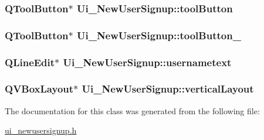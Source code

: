 \hypertarget{classUi__NewUserSignup_a8986890bfaa033e0f7cd167fe2bbd078}{
\subsubsection[{tool\-Button}]{\setlength{\rightskip}{0pt plus 5cm}Q\-Tool\-Button$\ast$ Ui\-\_\-\-New\-User\-Signup\-::tool\-Button}}\label{classUi__NewUserSignup_a8986890bfaa033e0f7cd167fe2bbd078}
\hypertarget{classUi__NewUserSignup_a0d72e06bcfa8a7ccb034598818920e06}{
\subsubsection[{tool\-Button\-\_\-2}]{\setlength{\rightskip}{0pt plus 5cm}Q\-Tool\-Button$\ast$ Ui\-\_\-\-New\-User\-Signup\-::tool\-Button\-\_}}\label{classUi__NewUserSignup_a0d72e06bcfa8a7ccb034598818920e06}
\hypertarget{classUi__NewUserSignup_af19014fffa6b0072ca567d5d8b700056}{
\subsubsection[{usernametext}]{\setlength{\rightskip}{0pt plus 5cm}Q\-Line\-Edit$\ast$ Ui\-\_\-\-New\-User\-Signup\-::usernametext}}\label{classUi__NewUserSignup_af19014fffa6b0072ca567d5d8b700056}
\hypertarget{classUi__NewUserSignup_aef74e92fd93855a252483d5b94b053da}{
\subsubsection[{vertical\-Layout}]{\setlength{\rightskip}{0pt plus 5cm}Q\-V\-Box\-Layout$\ast$ Ui\-\_\-\-New\-User\-Signup\-::vertical\-Layout}}\label{classUi__NewUserSignup_aef74e92fd93855a252483d5b94b053da}


The documentation for this class was generated from the following file\-:\begin{DoxyCompactItemize}
\item 
\hyperlink{ui__newusersignup_8h}{ui\-\_\-newusersignup.\-h}\end{DoxyCompactItemize}
